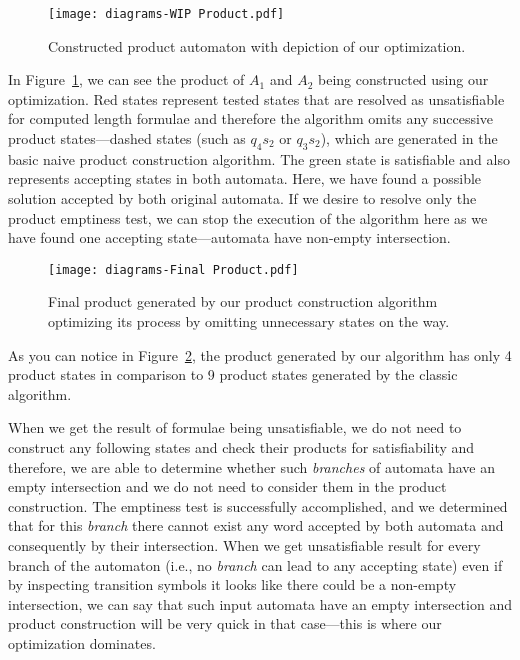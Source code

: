 \begin{figure}[ht]
	\centering
	\texttt{[image: diagrams-WIP Product.pdf]}
	\caption{Constructed product automaton with depiction of our optimization.}
	\label{fig:product_WIP}
\end{figure}

In Figure~\ref{fig:product_WIP}, we can see the product of $A_1$ and $A_2$ being constructed using our optimization. Red states represent tested states that are resolved as unsatisfiable for computed length formulae and therefore the algorithm omits any successive product states---dashed states (such as $q_4s_2$ or $q_3s_2$), which are generated in the basic naive product construction algorithm. The green state is satisfiable and also represents accepting states in both automata. Here, we have found a possible solution accepted by both original automata. If we desire to resolve only the product emptiness test, we can stop the execution of the algorithm here as we have found one accepting state---automata have non-empty intersection.

\begin{figure}[ht]
	\centering
	\texttt{[image: diagrams-Final Product.pdf]}
	\caption{Final product generated by our product construction algorithm optimizing its process by omitting unnecessary states on the way.}
	\label{fig:product_final}
\end{figure}

As you can notice in Figure~\ref{fig:product_final}, the product generated by our algorithm has only 4 product states in comparison to 9 product states generated by the classic algorithm.

When we get the result of formulae being unsatisfiable, we do not need to construct any following states and check their products for satisfiability and therefore, we are able to determine whether such \textit{branches} of automata have an empty intersection and we do not need to consider them in the product construction. The emptiness test is successfully accomplished, and we determined that for this \emph{branch} there cannot exist any word accepted by both automata and consequently by their intersection. When we get unsatisfiable result for every branch of the automaton (i.e., no \emph{branch} can lead to any accepting state) even if by inspecting transition symbols it looks like there could be a non-empty intersection, we can say that such input automata have an empty intersection and product construction will be very quick in that case---this is where our optimization dominates.

